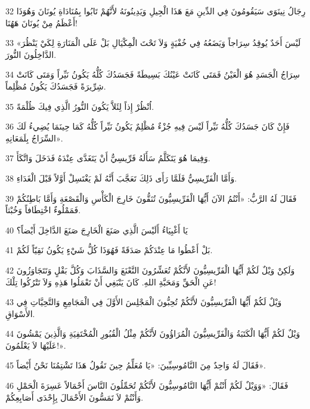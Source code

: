 \par 32 رِجَالُ نِينَوَى سَيَقُومُونَ فِي الدِّينِ مَعَ هَذَا الْجِيلِ وَيَدِينُونَهُ لأَنَّهُمْ تَابُوا بِمُنَادَاةِ يُونَانَ وَهُوَذَا أَعْظَمُ مِنْ يُونَانَ هَهُنَا!
\par 33 «لَيْسَ أَحَدٌ يُوقِدُ سِرَاجاً وَيَضَعُهُ فِي خُفْيَةٍ وَلاَ تَحْتَ الْمِكْيَالِ بَلْ عَلَى الْمَنَارَةِ لِكَيْ يَنْظُرَ الدَّاخِلُونَ النُّورَ.
\par 34 سِرَاجُ الْجَسَدِ هُوَ الْعَيْنُ فَمَتَى كَانَتْ عَيْنُكَ بَسِيطَةً فَجَسَدُكَ كُلُّهُ يَكُونُ نَيِّراً وَمَتَى كَانَتْ شِرِّيرَةً فَجَسَدُكَ يَكُونُ مُظْلِماً.
\par 35 اُنْظُرْ إِذاً لِئَلاَّ يَكُونَ النُّورُ الَّذِي فِيكَ ظُلْمَةً.
\par 36 فَإِنْ كَانَ جَسَدُكَ كُلُّهُ نَيِّراً لَيْسَ فِيهِ جُزْءٌ مُظْلِمٌ يَكُونُ نَيِّراً كُلُّهُ كَمَا حِينَمَا يُضِيءُ لَكَ السِّرَاجُ بِلَمَعَانِهِ».
\par 37 وَفِيمَا هُوَ يَتَكَلَّمُ سَأَلَهُ فَرِّيسِيٌّ أَنْ يَتَغَدَّى عِنْدَهُ فَدَخَلَ وَاتَّكَأَ.
\par 38 وَأَمَّا الْفَرِّيسِيُّ فَلَمَّا رَأَى ذَلِكَ تَعَجَّبَ أَنَّهُ لَمْ يَغْتَسِلْ أَوَّلاً قَبْلَ الْغَدَاءِ.
\par 39 فَقَالَ لَهُ الرَّبُّ: «أَنْتُمُ الآنَ أَيُّهَا الْفَرِّيسِيُّونَ تُنَقُّونَ خَارِجَ الْكَأْسِ وَالْقَصْعَةِ وَأَمَّا بَاطِنُكُمْ فَمَمْلُوءٌ اخْتِطَافاً وَخُبْثاً.
\par 40 يَا أَغْبِيَاءُ أَلَيْسَ الَّذِي صَنَعَ الْخَارِجَ صَنَعَ الدَّاخِلَ أَيْضاً؟
\par 41 بَلْ أَعْطُوا مَا عِنْدَكُمْ صَدَقَةً فَهُوَذَا كُلُّ شَيْءٍ يَكُونُ نَقِيّاً لَكُمْ.
\par 42 وَلَكِنْ وَيْلٌ لَكُمْ أَيُّهَا الْفَرِّيسِيُّونَ لأَنَّكُمْ تُعَشِّرُونَ النَّعْنَعَ وَالسَّذَابَ وَكُلَّ بَقْلٍ وَتَتَجَاوَزُونَ عَنِ الْحَقِّ وَمَحَبَّةِ اللهِ. كَانَ يَنْبَغِي أَنْ تَعْمَلُوا هَذِهِ وَلاَ تَتْرُكُوا تِلْكَ!
\par 43 وَيْلٌ لَكُمْ أَيُّهَا الْفَرِّيسِيُّونَ لأَنَّكُمْ تُحِبُّونَ الْمَجْلِسَ الأَوَّلَ فِي الْمَجَامِعِ وَالتَّحِيَّاتِ فِي الأَسْوَاقِ.
\par 44 وَيْلٌ لَكُمْ أَيُّهَا الْكَتَبَةُ وَالْفَرِّيسِيُّونَ الْمُرَاؤُونَ لأَنَّكُمْ مِثْلُ الْقُبُورِ الْمُخْتَفِيَةِ وَالَّذِينَ يَمْشُونَ عَلَيْهَا لاَ يَعْلَمُونَ!».
\par 45 فَقَالَ لَهُ وَاحِدٌ مِنَ النَّامُوسِيِّينَ: «يَا مُعَلِّمُ حِينَ تَقُولُ هَذَا تَشْتِمُنَا نَحْنُ أَيْضاً».
\par 46 فَقَالَ: «وَوَيْلٌ لَكُمْ أَنْتُمْ أَيُّهَا النَّامُوسِيُّونَ لأَنَّكُمْ تُحَمِّلُونَ النَّاسَ أَحْمَالاً عَسِرَةَ الْحَمْلِ وَأَنْتُمْ لاَ تَمَسُّونَ الأَحْمَالَ بِإِحْدَى أَصَابِعِكُمْ.
